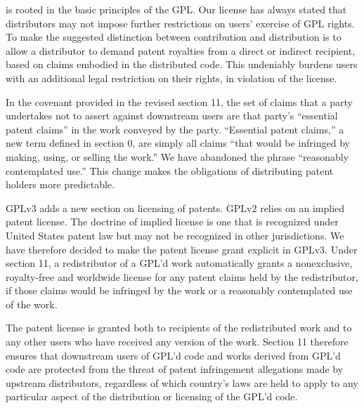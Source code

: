 
is rooted in the basic principles of the GPL.
Our license has always stated that distributors may not impose further
restrictions on users' exercise of GPL rights.  To make the suggested
distinction between contribution and distribution is to allow a
distributor to demand patent royalties from a direct or indirect
recipient, based on claims embodied in the distributed code. This
undeniably burdens users with an additional legal restriction on their
rights, in violation of the license.


In the covenant provided in the revised section 11, the set of claims
that a party undertakes not to assert against downstream users are that
party's ``essential patent claims'' in the work conveyed by the party.
``Essential patent claims,'' a new term defined in section 0, are simply
all claims ``that would be infringed by making, using, or selling the
work.''  We have abandoned the phrase ``reasonably contemplated use.''
This change makes the obligations of distributing patent holders more
predictable.


GPLv3 adds a new section on licensing of patents. GPLv2 relies on an implied
patent license. The doctrine of implied license is one that is recognized
under United States patent law but may not be recognized in other
jurisdictions. We have therefore decided to make the patent license grant
explicit in GPLv3. Under section 11, a redistributor of a GPL'd work
automatically grants a nonexclusive, royalty-free and worldwide license for
any patent claims held by the redistributor, if those claims would be
infringed by the work or a reasonably contemplated use of the work.


The patent license is granted both to recipients of the redistributed work
and to any other users who have received any version of the work. Section 11
therefore ensures that downstream users of GPL'd code and works derived from
GPL'd code are protected from the threat of patent infringement allegations
made by upstream distributors, regardless of which country's laws are held to
apply to any particular aspect of the distribution or licensing of the GPL'd
code.

